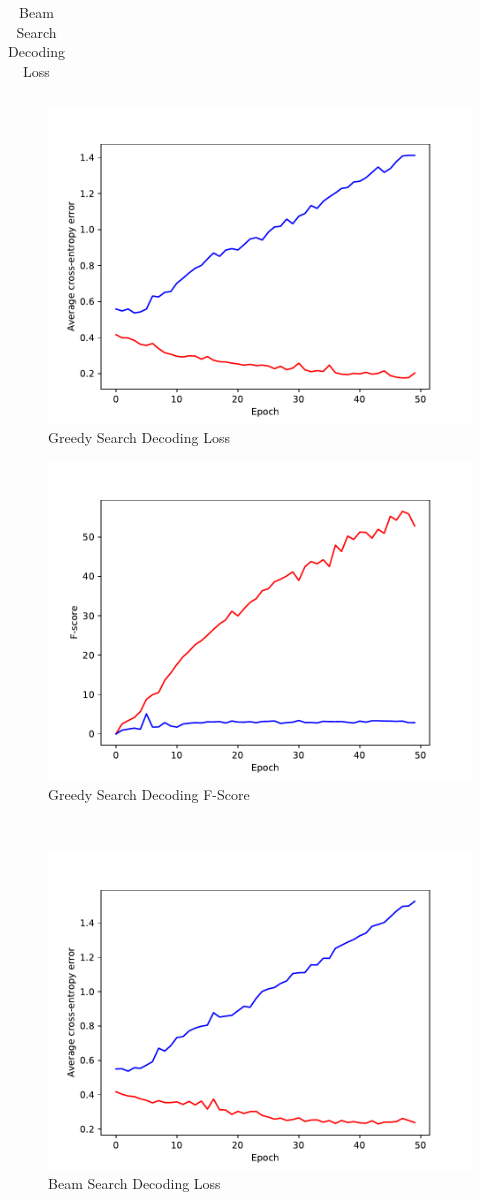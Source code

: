 \documentclass[11pt,a4paper]{article}
\begin{document}
\begin{table}[ht]
\centering
\begin{tabular}{cc}
\end{tabular}
\begin{subfigure}{0.4\textwidth}\centering\includegraphics[width=0.7\columnwidth]{fig_lrn_0p001_loss.pdf}\caption{Greedy Search Decoding Loss}\end{subfigure} %
\begin{subfigure}{0.4\textwidth}\centering\includegraphics[width=0.7\columnwidth]{fig_lrn_0p001_f.pdf}\caption{Greedy Search Decoding F-Score}\end{subfigure} \\
\begin{subfigure}{0.4\textwidth}\centering\includegraphics[width=0.7\columnwidth]{fig_lrn_0p001_beam_3_loss.pdf}\caption{Beam Search Decoding Loss}\end{subfigure} %

\end{table}
\end{document}
